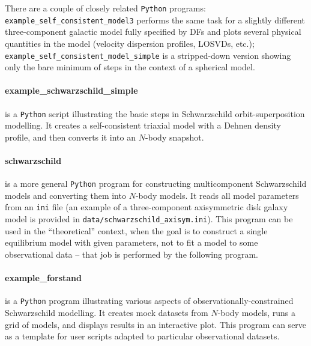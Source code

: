 \documentclass[12pt]{article}
\newcommand{\Python}{\texttt{Python}\xspace}
\begin{document}
There are a couple of closely related \Python programs:\\
\texttt{example_self_consistent_model3} performs the same task for a slightly different three-component galactic model fully specified by DFs and plots several physical quantities in the model (velocity dispersion profiles, LOSVDs, etc.);\\
\texttt{example_self_consistent_model_simple} is a stripped-down version showing only the bare minimum of steps in the context of a spherical model.

\paragraph{example_schwarzschild_simple} is a \Python script illustrating the basic steps in Schwarzschild orbit-superposition  modelling. It creates a self-consistent triaxial model with a Dehnen density profile, and then converts it into an $N$-body snapshot.

\paragraph{schwarzschild} is a more general \Python program for constructing multicomponent Schwarzschild models and converting them into $N$-body models. It reads all model parameters from an \texttt{ini} file (an example of a three-component axisymmetric disk galaxy model is provided in \texttt{data/schwarzschild_axisym.ini}). This program can be used in the ``theoretical'' context, when the goal is to construct a single equilibrium model with given parameters, not to fit a model to some observational data -- that job is performed by the following program.

\paragraph{example_forstand} is a \Python program illustrating various aspects of observationally-constrained Schwarzschild modelling. It creates mock datasets from $N$-body models, runs a grid of models, and displays results in an interactive plot. This program can serve as a template for user scripts adapted to particular observational datasets.

\label{sec:mkspherical}%
\end{document}
